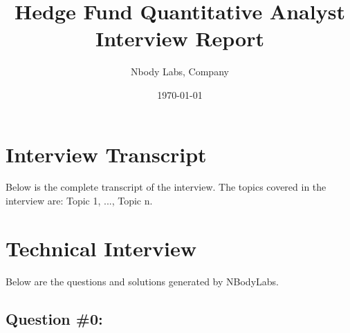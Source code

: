 \documentclass{article}%
\title{Hedge Fund Quantitative Analyst Interview Report}%
\author{Nbody Labs, Company}%
\date{\today}%
\begin{document}
%
\normalsize%
\maketitle%
\section{Interview Transcript}%
\label{sec:InterviewTranscript}%
Below is the complete transcript of the interview. %
The topics covered in the interview are: Topic 1, ..., Topic n.

%
\section{Technical Interview}%
\label{sec:TechnicalInterview}%
Below are the questions and solutions generated by NBodyLabs.%
\subsection{Question \#0: }%
\label{subsec:Question0}%
\end{document}
